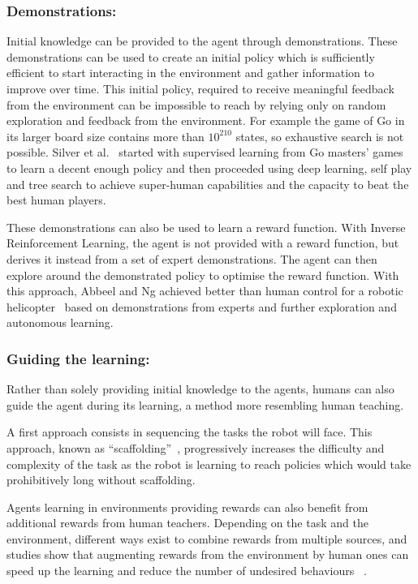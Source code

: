 \documentclass[letterpaper]{article} %
\begin{document}
\subsubsection{Demonstrations:} 

Initial knowledge can be provided to the agent through demonstrations. These
demonstrations can be used to create an initial policy which is sufficiently
efficient to start interacting in the environment and gather information to
improve over time. This initial policy, required to receive meaningful feedback
from the environment can be impossible to reach by relying only on random
exploration and feedback from the environment. For example the game of Go in its
larger board size contains more than $10^{210}$ states, so exhaustive search is
not possible.  Silver et al.~\cite{silver2016mastering} started with supervised
learning from Go masters' games to learn a decent enough policy and then
proceeded using deep learning, self play and tree search to achieve super-human
capabilities and the capacity to beat the best human players.

These demonstrations can also be used to learn a reward function. With Inverse
Reinforcement Learning, the agent is not provided with a reward function, but
derives it instead from a set of expert demonstrations. The agent can then
explore around the demonstrated policy to optimise the reward function. With
this approach, Abbeel and Ng achieved better than human control for a robotic
helicopter~\cite{abbeel2004apprenticeship} based on demonstrations from experts
and further exploration and autonomous learning.

\subsubsection{Guiding the learning:}

Rather than solely providing initial knowledge to the agents, humans can also
guide the agent during its learning, a method more resembling human teaching. 

A first approach consists in sequencing the tasks the robot will face.  This
approach, known as ``scaffolding''~\cite{saunders2006teaching}, progressively
increases the difficulty and complexity of the task as the robot is learning to
reach policies which would take prohibitively long without scaffolding.

Agents learning in environments providing rewards can also benefit from
additional rewards from human teachers. Depending on the task and the
environment, different ways exist to combine rewards from multiple sources, and
studies show that augmenting rewards from the environment by human ones can
speed up the learning and reduce the number of undesired behaviours~
\cite{griffith2013policy,knox2010combining,judah2010reinforcement}.
\end{document}
